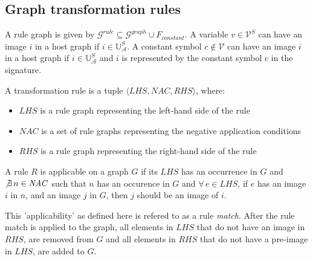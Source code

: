 \subsection{Graph transformation rules}\label{sec:graph_rules}
A rule graph is given by $\mathcal{G}^{rule} \subseteq \mathcal{G}^{graph} \cup F_{constant}$. A variable $v \in \mathcal{V}^{S}$ can have an image $i$ in a host graph if $i \in \mathbb{U}_\mathcal{A}^{S}$. A constant symbol $c \notin \mathcal{V}$ can have an image $i$ in a host graph if $i \in \mathbb{U}_\mathcal{A}^{S}$ and $i$ is represented by the constant symbol $c$ in the signature.
\vspace{5px}
\begin{definition}
A transformation rule is a tuple $\langle \mathit{LHS}, \mathit{NAC}, \mathit{RHS}\rangle$, where:
\begin{itemize}
  \item $\mathit{LHS}$ is a rule graph representing the left-hand side of the rule
  \item $\mathit{NAC}$ is a set of rule graphs representing the negative application conditions
  \item $\mathit{RHS}$ is a rule graph representing the right-hand side of the rule
\end{itemize}
\end{definition}

\begin{comment}\begin{definition}
$\mathit{LHS}$ is a tuple $\langle \mathcal{V}_{LHS}, \mathcal{E}_{LHS}, \mathcal{O}_{LHS} \rangle$, where $\mathcal{O}_{LHS} \subseteq \mathcal{V}^n \times O_p \times \mathcal{V}$.
\end{definition}\end{comment}

A rule $R$ is applicable on a graph $G$ if its $\mathit{LHS}$ has an occurrence in $G$ and $\not\exists\,n \in \mathit{NAC}$ such that $n$ has an occurence in $G$ and $\forall\,e \in \mathit{LHS}$, if $e$ has an image $i$ in $n$, and an image $j$ in $G$, then $j$ should be an image of $i$.

This 'applicability' as defined here is refered to as a rule \textit{match}. After the rule match is applied to the graph, all elements in $\mathit{LHS}$ that do not have an image in $\mathit{RHS}$, are removed from $G$ and all elements in $\mathit{RHS}$ that do not have a pre-image in $\mathit{LHS}$, are added to $G$.


